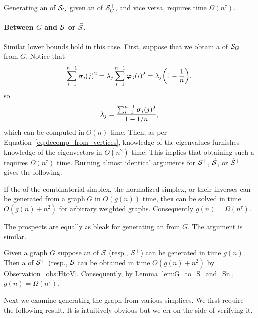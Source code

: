 \begin{lemma}
	\label{lem:hdesc_to_hdesc}
	Generating an \hdesc of $\mathcal{S}_G$ given an \hdesc of $\mathcal{S}_G^+$, and vice versa, requires time $\Omega(n^\tau)$. 
\end{lemma}


\paragraph{Between \texorpdfstring{$G$}{the graph} and \texorpdfstring{$\mathcal{S}$ or $\widehat{\mathcal{S}}$}{its simplices}.}
Similar lower  bounds  hold in this case. First, suppose that we obtain a \vdesc of $\mathcal{S}_G$ from $G$. Notice  that \[\sum_{i=1}^{n-1}   \vb*{\sigma}_i(j)^2 = \lambda_j \sum_{i=1}^{n-1} \vb*{\varphi}_j(i)^2 = \lambda_j\bigg(1-\frac{1}{n}\bigg),\]
so 
\[\lambda_j = \frac{\sum_{i=1}^{n-1}\vb*{\sigma}_i(j)^2}{1-1/n},\]
which can be computed  in $O(n)$  time. Then, as per Equation~\eqref{eq:decomp_from_vertices}, knowledge of the eigenvalues furnishes knowledge  of the eigenvectors in $O(n^2)$ time. This implies that obtaining such a \vdesc requires $\Omega(n^\tau)$ time. Running almost identical arguments for $\mathcal{S}^+$, $\widehat{\mathcal{S}}$, or $\widehat{\mathcal{S}}^+$ gives the  following. 

\begin{lemma}
	\label{lem:G_to_S_and_Sn}
	If the \vdesc of the combinatorial simplex, the normalized simplex, or their  inverses can be generated from a graph $G$ in $O(g(n))$ time, then \lapdecomp can be solved in time $O(g(n) + n^2)$ for arbitrary weighted graphs. Consequently $g(n) = \Omega(n^\tau)$. 
\end{lemma}

The prospects are  equally  as bleak for generating an \hdesc from $G$. The argument is  similar. 

\begin{lemma}
	Given a graph $G$ suppose an \hdesc of $\mathcal{S}$ (resp., $\mathcal{S}^+$) can be generated in time $g(n)$. Then a \vdesc of $\mathcal{S}^+$ (resp., $\mathcal{S}$ can be obtained in time $O(g(n) + n^2)$ by Observation~\ref{obs:HtoV}. Consequently, by Lemma \ref{lem:G_to_S_and_Sn}, $g(n)=\Omega(n^\tau)$. 
\end{lemma}

\todo 
Next we examine generating the graph  from various simplices. We first require the following result. It is intuitively  obvious but we err on  the side of verifying it. 

